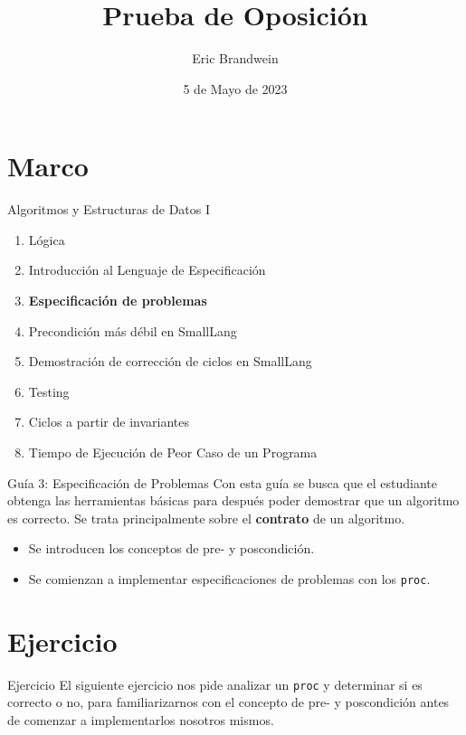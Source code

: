\documentclass{beamer}
\title{Prueba de Oposición}
\author{Eric Brandwein}
\date{5 de Mayo de 2023}
\begin{document}
\frame{\titlepage}

\section{Marco}
\begin{frame}{Algoritmos y Estructuras de Datos I}
    \large
    \begin{enumerate}
        \item Lógica
        \item Introducción al Lenguaje de Especificación
        \item {\bfseries\color{blue}Especificación de problemas}
        \item Precondición más débil en SmallLang
        \item Demostración de corrección de ciclos en SmallLang
        \item Testing
        \item Ciclos a partir de invariantes
        \item Tiempo de Ejecución de Peor Caso de un Programa
    \end{enumerate}
\end{frame}

\begin{frame}{Guía 3: Especificación de Problemas}
    \large
    Con esta guía se busca que el estudiante obtenga las herramientas básicas para después poder demostrar que un algoritmo es correcto. Se trata principalmente sobre el \textbf{contrato} de un algoritmo.\pause
    \vspace{2em}
    \begin{itemize}
        \item Se introducen los conceptos de pre- y poscondición.\pause
        \item Se comienzan a implementar especificaciones de problemas con los \texttt{proc}. 
    \end{itemize}
\end{frame}

\section{Ejercicio}
\begin{frame}{Ejercicio}
    \large
    El siguiente ejercicio nos pide analizar un \texttt{proc} y determinar si es correcto o no, para familiarizarnos con el concepto de pre- y poscondición antes de comenzar a implementarlos nosotros mismos. 

\end{frame}
\end{document}
